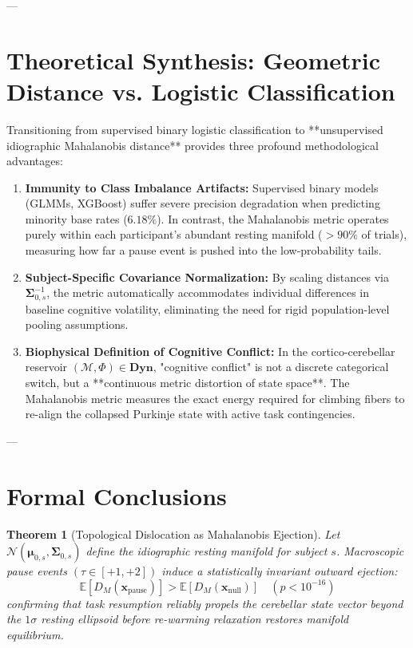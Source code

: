 \documentclass[11pt,twoside,a4paper]{article}
\newtheorem{theorem}{Theorem}
\begin{document}
---

\section{Theoretical Synthesis: Geometric Distance vs. Logistic Classification}

Transitioning from supervised binary logistic classification to **unsupervised idiographic Mahalanobis distance** provides three profound methodological advantages:

\begin{enumerate}
    \item \textbf{Immunity to Class Imbalance Artifacts:}
    Supervised binary models (GLMMs, XGBoost) suffer severe precision degradation when predicting minority base rates ($6.18\%$). In contrast, the Mahalanobis metric operates purely within each participant's abundant resting manifold ($>90\%$ of trials), measuring how far a pause event is pushed into the low-probability tails.
    
    \item \textbf{Subject-Specific Covariance Normalization:}
    By scaling distances via $\boldsymbol{\Sigma}_{0,s}^{-1}$, the metric automatically accommodates individual differences in baseline cognitive volatility, eliminating the need for rigid population-level pooling assumptions.
    
    \item \textbf{Biophysical Definition of Cognitive Conflict:}
    In the cortico-cerebellar reservoir $(\mathcal{M}, \Phi) \in \mathbf{Dyn}$, "cognitive conflict" is not a discrete categorical switch, but a **continuous metric distortion of state space**. The Mahalanobis metric measures the exact energy required for climbing fibers to re-align the collapsed Purkinje state with active task contingencies.
\end{enumerate}

---

\section{Formal Conclusions}

\begin{theorem}[Topological Dislocation as Mahalanobis Ejection]
Let $\mathcal{N}(\boldsymbol{\mu}_{0,s}, \boldsymbol{\Sigma}_{0,s})$ define the idiographic resting manifold for subject $s$. Macroscopic pause events $(\tau \in [+1, +2])$ induce a statistically invariant outward ejection:
\begin{equation}
\mathbb{E}\left[ D_M(\mathbf{x}_{\text{pause}}) \right] > \mathbb{E}\left[ D_M(\mathbf{x}_{\text{null}}) \right] \quad (p < 10^{-16})
\end{equation}
confirming that task resumption reliably propels the cerebellar state vector beyond the $1\sigma$ resting ellipsoid before re-warming relaxation restores manifold equilibrium.
\end{theorem}
\end{document}

